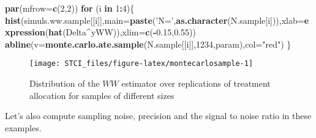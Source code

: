 \documentclass[]{book}
\newenvironment{Shaded}{\begin{snugshade}}{\end{snugshade}}
\newcommand{\ControlFlowTok}[1]{\textcolor[rgb]{0.13,0.29,0.53}{\textbf{#1}}}
\newcommand{\DataTypeTok}[1]{\textcolor[rgb]{0.13,0.29,0.53}{#1}}
\newcommand{\DecValTok}[1]{\textcolor[rgb]{0.00,0.00,0.81}{#1}}
\newcommand{\FloatTok}[1]{\textcolor[rgb]{0.00,0.00,0.81}{#1}}
\newcommand{\KeywordTok}[1]{\textcolor[rgb]{0.13,0.29,0.53}{\textbf{#1}}}
\newcommand{\NormalTok}[1]{#1}
\newcommand{\OperatorTok}[1]{\textcolor[rgb]{0.81,0.36,0.00}{\textbf{#1}}}
\newcommand{\StringTok}[1]{\textcolor[rgb]{0.31,0.60,0.02}{#1}}
\theoremstyle{definition}
\theoremstyle{definition}
\theoremstyle{definition}
\theoremstyle{remark}
\begin{document}
\begin{Shaded}
\begin{Highlighting}[]
\KeywordTok{par}\NormalTok{(}\DataTypeTok{mfrow=}\KeywordTok{c}\NormalTok{(}\DecValTok{2}\NormalTok{,}\DecValTok{2}\NormalTok{))}
\ControlFlowTok{for}\NormalTok{ (i }\ControlFlowTok{in} \DecValTok{1}\OperatorTok{:}\DecValTok{4}\NormalTok{)\{}
  \KeywordTok{hist}\NormalTok{(simuls.ww.sample[[i]],}\DataTypeTok{main=}\KeywordTok{paste}\NormalTok{(}\StringTok{'N='}\NormalTok{,}\KeywordTok{as.character}\NormalTok{(N.sample[i])),}\DataTypeTok{xlab=}\KeywordTok{expression}\NormalTok{(}\KeywordTok{hat}\NormalTok{(Delta}\OperatorTok{^}\NormalTok{yWW)),}\DataTypeTok{xlim=}\KeywordTok{c}\NormalTok{(}\OperatorTok{-}\FloatTok{0.15}\NormalTok{,}\FloatTok{0.55}\NormalTok{))}
  \KeywordTok{abline}\NormalTok{(}\DataTypeTok{v=}\KeywordTok{monte.carlo.ate.sample}\NormalTok{(N.sample[[i]],}\DecValTok{1234}\NormalTok{,param),}\DataTypeTok{col=}\StringTok{"red"}\NormalTok{)}
\NormalTok{\}}
\end{Highlighting}
\end{Shaded}

\begin{figure}[htbp]

{\centering \texttt{[image: STCI\_files/figure-latex/montecarlosample-1]} 

}

\caption{Distribution of the $WW$ estimator over replications of treatment allocation for samples of different sizes}\label{fig:montecarlosample}
\end{figure}

Let's also compute sampling noise, precision and the signal to noise ratio in these examples.
\end{document}
